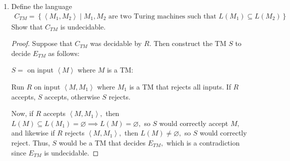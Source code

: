 \documentclass{article}
\begin{document}
\begin{enumerate}
\begin{proof}
			$S=$ on input $\left< M, w\right>$ where $M$ is a $TM$ and $w$ is a string:
			\begin{enumerate}[(1)]
				\ii Construct a TM $N$ as follows:

				$N=$ on input $x:$
				\begin{enumerate}[(a)]
					\ii Simulate $M$ on $w.$
					\ii If $M$ accepts $w$ and $x=01,$ then $N$ accepts. Otherwise, $N$ rejects.
					\ii If $M$ rejects $w,$ then $N$ rejects.
				\end{enumerate}
				\ii Simulate $R$ on $\left< N\right>.$
				\ii If $R$ rejects, then $S$ accepts, otherwise $S$ rejects.
			\end{enumerate}

			Now, if $M$ accepts $w,$ then $N$ only accepts $\left\{ 01 \right\},$ so $R$ would reject $\left< N\right>,$ and thus $S$ would accept $\left< M, w\right>.$ On the other hand, if $M$ rejects $w,$ then $N$ rejects every string, so $R$ would accept $\left< N\right>,$ and thus $S$ would reject $\left< M, w\right>.$ Thus, $S$ would be TM that decides $A_{TM},$ which is a contradiction since $E_{TM}$ is undecidable.
		\end{proof}

		\newpage
	\item Define the language
		\begin{align*}
			C_{TM}=\left\{ \left< M_1, M_2\right>\mid M_1, M_2\text{ are two Turing machines such that }L(M_1)\subseteq L(M_2) \right\}
		\end{align*}
		Show that $C_{TM}$ is undecidable.
		\begin{proof}
			Suppose that $C_{TM}$ was decidable by $R.$ Then construct the TM $S$ to decide $E_{TM}$ as follows:

			$S=$ on input $\left< M\right>$ where $M$ is a TM: 
			\begin{enumerate}[(1)]
				\ii Run $R$ on input $\left< M, M_1\right>$ where $M_1$ is a TM that rejects all inputs.
				\ii If $R$ accepts, $S$ accepts, otherwise $S$ rejects.
			\end{enumerate}

			Now, if $R$ accepts $\left< M, M_1\right>,$ then $L(M)\subseteq L(M_1)=\varnothing\implies L(M)=\varnothing,$ so $S$ would correctly accept $M,$ and likewise if $R$ rejects $\left< M, M_1\right>,$ then $L(M)\neq\varnothing,$ so $S$ would correctly reject. Thus, $S$ would be a TM that decides $E_{TM},$ which is a contradiction since $E_{TM}$ is undecidable.
		\end{proof}


\end{enumerate}
\end{document}
